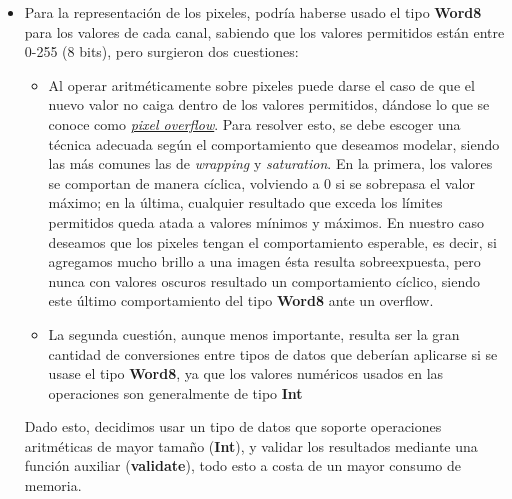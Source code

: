 \documentclass[a4paper, 11pt]{article} %
\begin{document}
\begin{itemize}
		
		\item Para la representación de los pixeles, podría haberse usado el tipo \textbf{Word8} para los valores de cada canal, sabiendo que los valores permitidos están entre 0-255 (8 bits), pero surgieron dos cuestiones:
		\begin{itemize} 
			\item Al operar aritméticamente sobre pixeles puede darse el caso de que el nuevo valor no caiga dentro de los valores permitidos, dándose lo que se conoce como \textit{\href{http://homepages.inf.ed.ac.uk/rbf/HIPR2/wrap.htm}{pixel overflow}}. Para resolver esto, se debe escoger una técnica adecuada según el comportamiento que deseamos modelar, siendo las más comunes las de \textit{wrapping} y \textit{saturation}. En la primera, los valores se comportan de manera cíclica, volviendo a 0 si se sobrepasa el valor máximo; en la última, cualquier resultado que exceda los límites permitidos queda atada a valores mínimos y máximos. En nuestro caso deseamos que los pixeles tengan el comportamiento esperable, es decir, si agregamos mucho brillo a una imagen ésta resulta sobreexpuesta, pero nunca con valores oscuros resultado un comportamiento cíclico, siendo este último comportamiento del tipo \textbf{Word8} ante un overflow.
			\item La segunda cuestión, aunque menos importante, resulta ser la gran cantidad de conversiones entre tipos de datos que deberían aplicarse si se usase el tipo \textbf{Word8}, ya que los valores numéricos usados en las operaciones son generalmente de tipo \textbf{Int}
		\end{itemize}
		Dado esto, decidimos usar un tipo de datos que soporte operaciones aritméticas de mayor tamaño (\textbf{Int}), y validar los resultados mediante una función auxiliar (\textbf{validate}), todo esto a costa de un mayor consumo de memoria.
		

\end{itemize}
\end{document}
